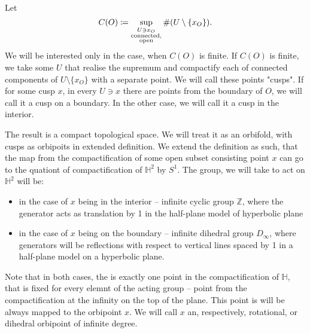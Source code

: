 Let 
\begin{equation}
C(O) \coloneqq \sup\limits_{\substack{U \ni x_O \\ \rm connected, \\ \rm open }} 
\#(U\setminus\{x_O\}).
\end{equation}
We will be interested only in the case, when $C(O)$ is finite.
If $C(O)$ is finite, we take some $U$ that realise the supremum and compactify each of 
connected components of $U\setminus\{x_O\}$ with a separate point. We will call these points 
"cusps". If for some cusp $x$, in every $U \ni x$ there are points from the boundary of $O$, 
we will call it a cusp on a boundary. In the other case, we will call it a cusp in the interior.

The result is a compact topological space. We will treat it as an orbifold, with 
cusps as orbipoits in extended definition. 
We extend the definition as such, that the map from the compactification of 
some open subset consisting point $x$ can go to the quationt of compactification of 
$\mathbb{H}^2$ by $S^1$. The group, we will take to act on $\mathbb{H}^2$ will 
be:
\begin{itemize} 
\item in the case of $x$ being in the interior -- infinite cyclic group $\mathbb{Z}$, 
where the generator acts as translation by 1 
in the half-plane model of hyperbolic plane   
\item in the case of $x$ being on the boundary -- infinite dihedral group $D_\infty$, where 
generators will be reflections with respect to vertical lines spaced by 1 in a half-plane 
model on a hyperbolic plane.
\end{itemize}

Note that in both cases, the is exactly one point in the compactification of $\mathbb{H}$, that is 
fixed for every elemnt of the acting group -- point from the compactification at 
the infinity on the top of the plane. This point is will be always mapped to the orbipoint $x$. 
We will call $x$ an, respectively, rotational, or dihedral orbipoint of infinite degree.


